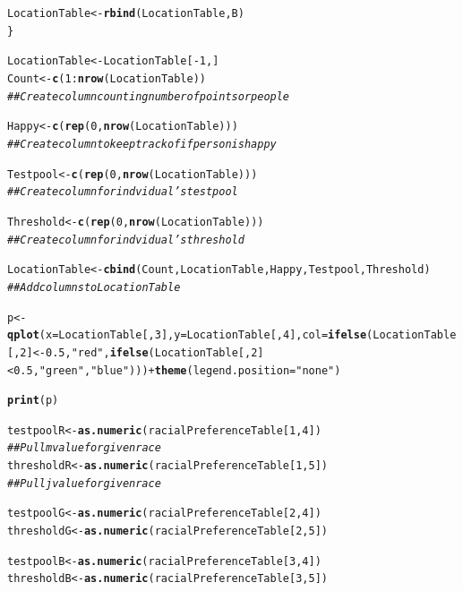 \documentclass{article}\usepackage[]{graphicx}\usepackage[]{color}
\makeatletter
\newcommand{\hlnum}[1]{\textcolor[rgb]{0.686,0.059,0.569}{#1}}%
\newcommand{\hlstr}[1]{\textcolor[rgb]{0.192,0.494,0.8}{#1}}%
\newcommand{\hlcom}[1]{\textcolor[rgb]{0.678,0.584,0.686}{\textit{#1}}}%
\newcommand{\hlopt}[1]{\textcolor[rgb]{0,0,0}{#1}}%
\newcommand{\hlstd}[1]{\textcolor[rgb]{0.345,0.345,0.345}{#1}}%
\newcommand{\hlkwb}[1]{\textcolor[rgb]{0.69,0.353,0.396}{#1}}%
\newcommand{\hlkwc}[1]{\textcolor[rgb]{0.333,0.667,0.333}{#1}}%
\newcommand{\hlkwd}[1]{\textcolor[rgb]{0.737,0.353,0.396}{\textbf{#1}}}%
\newenvironment{kframe}{%
 \def\at@end@of@kframe{}%
 \ifinner\ifhmode%
  \def\at@end@of@kframe{\end{minipage}}%
  \begin{minipage}{\columnwidth}%
 \fi\fi%
 \def\FrameCommand##1{\hskip\@totalleftmargin \hskip-\fboxsep
 \colorbox{shadecolor}{##1}\hskip-\fboxsep
     \hskip-\linewidth \hskip-\@totalleftmargin \hskip\columnwidth}%
 \MakeFramed {\advance\hsize-\width
   \@totalleftmargin\z@ \linewidth\hsize
   \@setminipage}}%
 {\par\unskip\endMakeFramed%
 \at@end@of@kframe}
\newenvironment{knitrout}{}{} %
\makeatother
\begin{document}
\begin{knitrout}
\begin{kframe}
\begin{alltt}
    \hlstd{LocationTable} \hlkwb{<-} \hlkwd{rbind}\hlstd{(LocationTable, B)}
  \hlstd{\}}

  \hlstd{LocationTable} \hlkwb{<-} \hlstd{LocationTable[}\hlopt{-}\hlnum{1}\hlstd{,]}
  \hlstd{Count} \hlkwb{<-} \hlkwd{c}\hlstd{(}\hlnum{1}\hlopt{:}\hlkwd{nrow}\hlstd{(LocationTable))}
  \hlcom{## Create column counting number of points or people}

  \hlstd{Happy} \hlkwb{<-} \hlkwd{c}\hlstd{(}\hlkwd{rep}\hlstd{(}\hlnum{0}\hlstd{,} \hlkwd{nrow}\hlstd{(LocationTable)))}
  \hlcom{## Create column to keep track of if person is happy}

  \hlstd{Testpool} \hlkwb{<-} \hlkwd{c}\hlstd{(}\hlkwd{rep}\hlstd{(}\hlnum{0}\hlstd{,} \hlkwd{nrow}\hlstd{(LocationTable)))}
  \hlcom{## Create column for indvidual's testpool}

  \hlstd{Threshold} \hlkwb{<-} \hlkwd{c}\hlstd{(}\hlkwd{rep}\hlstd{(}\hlnum{0}\hlstd{,} \hlkwd{nrow}\hlstd{(LocationTable)))}
  \hlcom{## Create column for indvidual's threshold}

  \hlstd{LocationTable} \hlkwb{<-} \hlkwd{cbind}\hlstd{(Count, LocationTable, Happy, Testpool, Threshold)}
  \hlcom{## Add columns to Location Table}


  \hlstd{p} \hlkwb{<-} \hlkwd{qplot}\hlstd{(}\hlkwc{x} \hlstd{= LocationTable[,}\hlnum{3}\hlstd{],} \hlkwc{y} \hlstd{= LocationTable [,}\hlnum{4}\hlstd{],} \hlkwc{col} \hlstd{=} \hlkwd{ifelse}\hlstd{(LocationTable[,}\hlnum{2}\hlstd{]} \hlopt{< -}\hlnum{0.5}\hlstd{,} \hlstr{"red"}\hlstd{,} \hlkwd{ifelse}\hlstd{(LocationTable[,}\hlnum{2}\hlstd{]} \hlopt{<} \hlnum{0.5}\hlstd{,} \hlstr{"green"}\hlstd{,} \hlstr{"blue"}\hlstd{)))} \hlopt{+} \hlkwd{theme}\hlstd{(}\hlkwc{legend.position} \hlstd{=} \hlstr{"none"}\hlstd{)}

  \hlkwd{print}\hlstd{(p)}

  \hlstd{testpoolR} \hlkwb{<-} \hlkwd{as.numeric}\hlstd{(racialPreferenceTable[}\hlnum{1}\hlstd{,}\hlnum{4}\hlstd{])}
  \hlcom{## Pull m value for given race}
  \hlstd{thresholdR} \hlkwb{<-} \hlkwd{as.numeric}\hlstd{(racialPreferenceTable[}\hlnum{1}\hlstd{,}\hlnum{5}\hlstd{])}
  \hlcom{##Pull j value for given race}

  \hlstd{testpoolG} \hlkwb{<-} \hlkwd{as.numeric}\hlstd{(racialPreferenceTable[}\hlnum{2}\hlstd{,}\hlnum{4}\hlstd{])}
  \hlstd{thresholdG} \hlkwb{<-} \hlkwd{as.numeric}\hlstd{(racialPreferenceTable[}\hlnum{2}\hlstd{,}\hlnum{5}\hlstd{])}

  \hlstd{testpoolB} \hlkwb{<-} \hlkwd{as.numeric}\hlstd{(racialPreferenceTable[}\hlnum{3}\hlstd{,}\hlnum{4}\hlstd{])}
  \hlstd{thresholdB} \hlkwb{<-} \hlkwd{as.numeric}\hlstd{(racialPreferenceTable[}\hlnum{3}\hlstd{,}\hlnum{5}\hlstd{])}


\end{alltt}
\end{kframe}
\end{knitrout}
\end{document}

